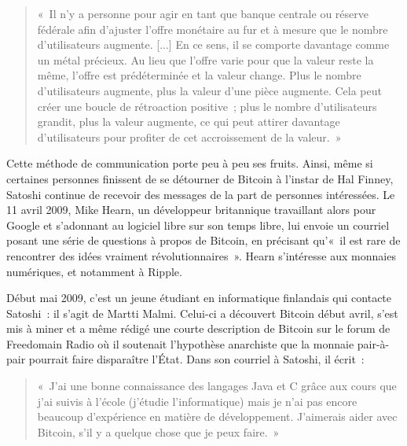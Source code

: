 \begin{quote}
«~Il n'y a personne pour agir en tant que banque centrale ou réserve fédérale afin d'ajuster l'offre monétaire au fur et à mesure que le nombre d'utilisateurs augmente. [...] En ce sens, il se comporte davantage comme un métal précieux. Au lieu que l'offre varie pour que la valeur reste la même, l'offre est prédéterminée et la valeur change. Plus le nombre d'utilisateurs augmente, plus la valeur d'une pièce augmente. Cela peut créer une boucle de rétroaction positive~; plus le nombre d'utilisateurs grandit, plus la valeur augmente, ce qui peut attirer davantage d'utilisateurs pour profiter de cet accroissement de la valeur.~»
\end{quote}


Cette méthode de communication porte peu à peu ses fruits. Ainsi, même si certaines personnes finissent de se détourner de Bitcoin à l'instar de Hal Finney, Satoshi continue de recevoir des messages de la part de personnes intéressées. Le 11 avril 2009, Mike Hearn, un développeur britannique travaillant alors pour Google et s'adonnant au logiciel libre sur son temps libre, lui envoie un courriel posant une série de questions à propos de Bitcoin, en précisant qu'«~il est rare de rencontrer des idées vraiment révolutionnaires~». Hearn s'intéresse aux monnaies numériques, et notamment à Ripple.

Début mai 2009, c'est un jeune étudiant en informatique finlandais qui contacte Satoshi~: il s'agit de Martti Malmi. Celui-ci a découvert Bitcoin début avril, s'est mis à miner et a même rédigé une courte description de Bitcoin sur le forum de Freedomain Radio où il soutenait l'hypothèse anarchiste que la monnaie pair-à-pair pourrait faire disparaître l'État. Dans son courriel à Satoshi, il écrit~:

\begin{quote}
«~J'ai une bonne connaissance des langages Java et C grâce aux cours que j'ai suivis à l'école (j'étudie l'informatique) mais je n'ai pas encore beaucoup d'expérience en matière de développement. J'aimerais aider avec Bitcoin, s'il y a quelque chose que je peux faire.~»
\end{quote}

